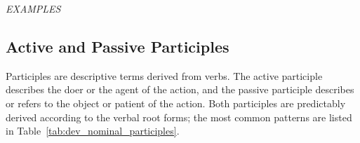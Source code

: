 \documentclass[grammar]{subfiles}
\begin{document}
  \begin{exe}
    \ex \emph{EXAMPLES}
  \end{exe}

  \subsection{Active and Passive Participles}
  \label{ssec:dev_active_passive_participles}

  Participles are descriptive terms derived from verbs. The active participle describes the doer or the agent of the action, and the passive participle describes or refers to the object or patient of the action. Both participles are predictably derived according to the verbal root forms; the most common patterns are listed in Table~\ref{tab:dev_nominal_participles}.
\end{document}
